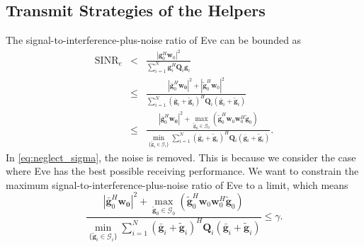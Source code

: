 \documentclass[journal]{IEEEtran}
\begin{document}
\subsection{Transmit Strategies of the Helpers}
The signal-to-interference-plus-noise ratio of Eve can be bounded as
\begin{eqnarray}
\mathrm{SINR}_e & < & \frac{\left| \mathbf{g}_{0}^H\mathbf{w}_{0}\right|^2}{\sum_{i=1}^{N}\mathbf{g}_{i}^H\mathbf{Q}_{i}\mathbf{g}_i} \label{eq:neglect_sigma}\\
&\leq & \frac{\left|\bar{\mathbf{g}}_0^H\mathbf{w_0}\right|^2 + \left|\tilde{\mathbf{g}}_0^H\mathbf{w}_0\right|^2}{\sum_{i = 1}^N(\bar{\mathbf{g}}_i+\tilde{\mathbf{g}}_i)^H\mathbf{Q}_i(\bar{\mathbf{g}}_i+\tilde{\mathbf{g}}_i)}\\
& \leq & \frac{\left|\bar{\mathbf{g}}_0^H\mathbf{w_0}\right|^2 + \max_{\tilde{\mathbf{g}}_0 \in \mathcal{G}_0}(\tilde{\mathbf{g}}_0^H\mathbf{w}_0\mathbf{w}_0^H\tilde{\mathbf{g}}_0)}{\min_{\{\tilde{\mathbf{g}}_i \in \mathcal{G}_i\}}\sum_{i = 1}^N(\bar{\mathbf{g}}_i+\tilde{\mathbf{g}}_i)^H\mathbf{Q}_i(\bar{\mathbf{g}}_i+\tilde{\mathbf{g}}_i)} .
\label{eq:SINR_e}
\end{eqnarray}
In \eqref{eq:neglect_sigma}, the noise is removed. This is because we consider the case where Eve has the best possible receiving performance. 
We want to constrain the maximum signal-to-interference-plus-noise ratio of Eve to a limit, which means
\begin{equation} \label{eq:SINR_constraint}
\frac{\left|\bar{\mathbf{g}}_0^H\mathbf{w_0}\right|^2 + \max_{\tilde{\mathbf{g}}_0 \in \mathcal{G}_0}(\tilde{\mathbf{g}}_0^H\mathbf{w}_0\mathbf{w}_0^H\tilde{\mathbf{g}}_0)}{\min_{\{\tilde{\mathbf{g}}_i \in \mathcal{G}_i\}}\sum_{i = 1}^N(\bar{\mathbf{g}}_i+\tilde{\mathbf{g}}_i)^H\mathbf{Q}_i(\bar{\mathbf{g}}_i+\tilde{\mathbf{g}}_i)} \leq \gamma.
\end{equation}
\end{document}

